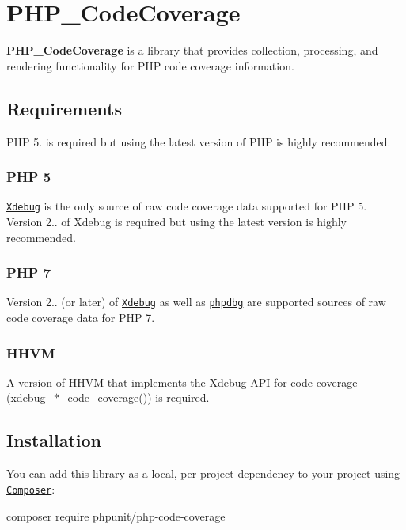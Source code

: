 \href{https://packagist.org/packages/phpunit/php-code-coverage}{\tt } \href{https://travis-ci.org/sebastianbergmann/php-code-coverage}{\tt }

\section*{P\+H\+P\+\_\+\+Code\+Coverage}

{\bfseries P\+H\+P\+\_\+\+Code\+Coverage} is a library that provides collection, processing, and rendering functionality for P\+HP code coverage information.

\subsection*{Requirements}

P\+HP 5. is required but using the latest version of P\+HP is highly recommended.

\subsubsection*{P\+HP 5}

\href{http://xdebug.org/}{\tt Xdebug} is the only source of raw code coverage data supported for P\+HP 5. Version 2.. of Xdebug is required but using the latest version is highly recommended.

\subsubsection*{P\+HP 7}

Version 2.. (or later) of \href{http://xdebug.org/}{\tt Xdebug} as well as \href{http://phpdbg.com/docs}{\tt phpdbg} are supported sources of raw code coverage data for P\+HP 7.

\subsubsection*{H\+H\+VM}

\mbox{\hyperlink{class_a}{A}} version of H\+H\+VM that implements the Xdebug A\+PI for code coverage ({\ttfamily xdebug\+\_\+$\ast$\+\_\+code\+\_\+coverage()}) is required.

\subsection*{Installation}

You can add this library as a local, per-\/project dependency to your project using \href{https://getcomposer.org/}{\tt Composer}\+: \begin{DoxyVerb}composer require phpunit/php-code-coverage
\end{DoxyVerb}


